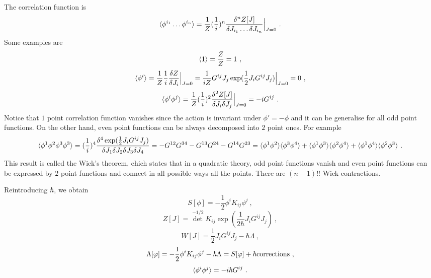     The correlation function is
    \begin{equation*}
        \langle\phi^{i_1} \ldots \phi^{i_n}\rangle = \frac{1}{Z} (\frac{1}{i})^n \frac{\delta^n Z[J]}{\delta J_{i_1} \ldots \delta J_{i_n}} \Big \vert_{J=0} ~.
    \end{equation*}
    Some examples are 
    \begin{equation*}
        \langle1\rangle = \frac{Z}{Z} = 1 ~,
    \end{equation*}
    \begin{equation*}
        \langle\phi^i\rangle = \frac{1}{Z} \frac{1}{i} \frac{\delta Z}{\delta J_i} \Big \vert_{J=0} = \frac{1}{iZ} G^{ij} J_j \exp(\frac{1}{2} J_i G^{ij} J_j) \Big \vert_{J=0} = 0 ~,
    \end{equation*}
    \begin{equation*}
        \langle\phi^i \phi^j\rangle = \frac{1}{Z} (\frac{1}{i})^2 \frac{\delta^2 Z[J]}{\delta J_{i} \delta J_j} \Big \vert_{J=0} = - i G^{ij} ~.
    \end{equation*}
    Notice that $1$ point correlation function vanishes since the action is invariant under $\phi' = - \phi$ and it can be generalise for all odd point functions. On the other hand, even point functions can be always decomposed into $2$ point ones. For example 
    \begin{equation*}
        \langle\phi^1 \phi^2 \phi^3 \phi^3\rangle = (\frac{1}{i})^4 \frac{\delta^4 \exp(\frac{1}{2} J_i G^{ij} J_j)}{\delta J_1 \delta J_2 \delta J_3 \delta J_4} = - G^{12} G^{34} - G^{13} G^{24} - G^{14} G^{23} =  \langle\phi^1 \phi^2\rangle \langle\phi^3 \phi^4\rangle + \langle\phi^1 \phi^3\rangle \langle\phi^2 \phi^4\rangle + \langle\phi^1 \phi^4\rangle \langle\phi^2 \phi^3\rangle ~. 
    \end{equation*}
    This result is called the Wick's theorem, ehich states that in a quadratic theory, odd point functions vanish and even point functions can be expressed by $2$ point functions and connect in all possible ways all the points. There are $(n - 1)!!$ Wick contractions.

    Reintroducing $\hbar$, we obtain 
    \begin{equation*}
        S[\phi] = - \frac{1}{2} \phi^i K_{ij} \phi^j ~,
    \end{equation*}
    \begin{equation*}
        Z[J] = \det^{-1/2} K_{ij} \exp(\frac{1}{2 \hbar} J_i G^{ij} J_j) ~,
    \end{equation*}
    \begin{equation*}
        W[J] = \frac{1}{2} J_i G^{ij} J_j - \hbar \Lambda ~,
    \end{equation*}
    \begin{equation*}
        \Lambda[\varphi] = - \frac{1}{2} \phi^i K_{ij} \phi^j - \hbar \Lambda = S[\varphi] + \hbar \textnormal{corrections} ~,
    \end{equation*}
    \begin{equation*}
        \langle\phi^i \phi^j\rangle = - i \hbar G^{ij} ~.
    \end{equation*}

